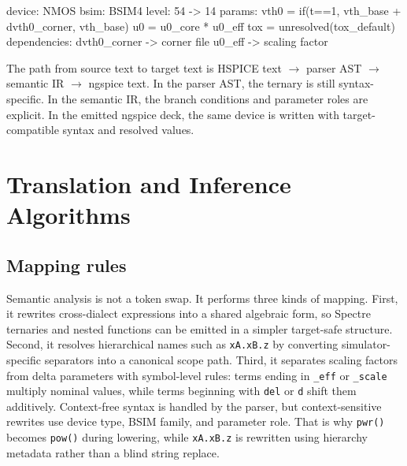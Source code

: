 \documentclass[conference]{IEEEtran}
\begin{document}
\begin{center}
\footnotesize
\begin{minipage}{0.97\columnwidth}
\ttfamily
device: NMOS\newline
bsim: BSIM4\newline
level: 54 -> 14\newline
params:\newline
    vth0 = if(t==1, vth\_base + dvth0\_corner, vth\_base)\newline
    u0   = u0\_core * u0\_eff\newline
    tox  = unresolved(tox\_default)\newline
dependencies:\newline
    dvth0\_corner -> corner file\newline
    u0\_eff -> scaling factor
\end{minipage}
\end{center}

The path from source text to target text is HSPICE text $\rightarrow$ parser AST $\rightarrow$ semantic IR $\rightarrow$ ngspice text. In the parser AST, the ternary is still syntax-specific. In the semantic IR, the branch conditions and parameter roles are explicit. In the emitted ngspice deck, the same device is written with target-compatible syntax and resolved values.

\vspace{-0.6cm}

\section{Translation and Inference Algorithms}
\label{sec:algorithms}
\vspace{-0.6cm}
\subsection{Mapping rules}
Semantic analysis is not a token swap. It performs three kinds of mapping. First, it rewrites cross-dialect expressions into a shared algebraic form, so Spectre ternaries and nested functions can be emitted in a simpler target-safe structure. Second, it resolves hierarchical names such as \texttt{xA.xB.z} by converting simulator-specific separators into a canonical scope path. Third, it separates scaling factors from delta parameters with symbol-level rules: terms ending in \texttt{_eff} or \texttt{_scale} multiply nominal values, while terms beginning with \texttt{del} or \texttt{d} shift them additively. Context-free syntax is handled by the parser, but context-sensitive rewrites use device type, BSIM family, and parameter role. That is why \texttt{pwr(\cdot)} becomes \texttt{pow(\cdot)} during lowering, while \texttt{xA.xB.z} is rewritten using hierarchy metadata rather than a blind string replace.
\end{document}
